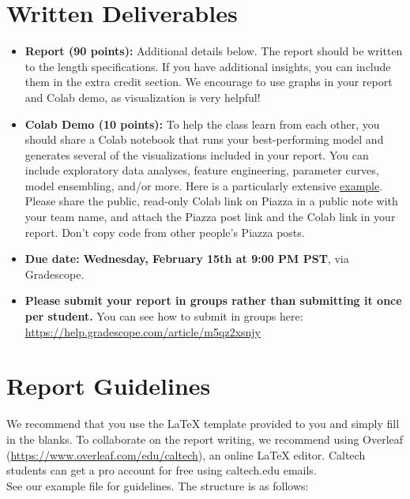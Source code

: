 \section{Written Deliverables}
\medskip

\begin{itemize}
    \item \textbf{Report (90 points):} Additional details below. The report should be written to the length specifications. If you have additional insights, you can include them in the extra credit section. We encourage to use graphs in your report and Colab demo, as visualization is very helpful!
    \item \textbf{Colab Demo (10 points):} To help the class learn from each other, you should share a Colab notebook that runs your best-performing model and generates several of the visualizations included in your report. You can include exploratory data analyses, feature engineering, parameter curves, model ensembling, and/or more. Here is a particularly extensive \href{https://www.kaggle.com/cdeotte/how-to-choose-cnn-architecture-mnist}{example}. Please share the public, read-only Colab link on Piazza in a public note with your team name, and attach the Piazza post link and the Colab link in your report. Don't copy code from other people's Piazza posts.
    \item \textbf{Due date:} \textbf{Wednesday, February 15th at 9:00 PM PST}, via Gradescope.
    \item \textbf{Please submit your report in groups rather than submitting it once per student.}  You can see how to submit in groups here:\\ \url{https://help.gradescope.com/article/m5qz2xsnjy}
\end{itemize}

\section{Report Guidelines}
\noindent We recommend that you use the LaTeX template provided to you and simply fill in the blanks. To collaborate on the report writing, we recommend using Overleaf (\url{https://www.overleaf.com/edu/caltech}), an online LaTeX editor. Caltech students can get a pro account for free using caltech.edu emails. \\

See our example file for guidelines. The structure is as follows:

